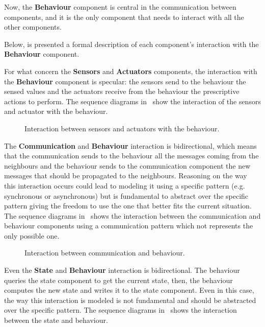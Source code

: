 Now, the \textbf{Behaviour} component is central in the communication between components, and it is the only component that needs to interact with all the other components.

Below, is presented a formal description of each component's interaction with the \textbf{Behaviour} component.

For what concern the \textbf{Sensors} and \textbf{Actuators} components, the interaction with the \textbf{Behaviour} component is specular: the
sensors send to the behaviour the sensed values and the actuators receive from the behaviour the prescriptive actions to perform.
The sequence diagrams in~ show the interaction of the sensors and actuator with the
behaviour.

\begin{figure}
	\centering
	\caption{Interaction between sensors and actuators with the behaviour.}
	\label{fig:framework-components-interaction-2-sensors-actuators}
\end{figure}

The \textbf{Communication} and \textbf{Behaviour} interaction is bidirectional, which means that the communication sends to the behaviour all the
messages coming from the neighbours and the behaviour sends to the communication component the new messages that should be propagated
to the neighbours.
Reasoning on the way this interaction occurs could lead to modeling it using a specific pattern (e.g. synchronous or asynchronous) but is fundamental
to abstract over the specific pattern giving the freedom to use the one that better fits the current situation.
The sequence diagrams in~ shows the interaction between the communication and
behaviour components using a communication pattern which not represents the only possible one.

\begin{figure}
	\centering
	\caption{Interaction between communication and behaviour.}
	\label{fig:framework-components-interaction-2-communication-behaviour}
\end{figure}

Even the \textbf{State} and \textbf{Behaviour} interaction is bidirectional.
The behaviour queries the state component to get the current state, then, the behaviour computes the new state and writes it to the state component.
Even in this case, the way this interaction is modeled is not fundamental and should be abstracted over the specific pattern.
The sequence diagrams in~ shows the interaction between the state and behaviour.

